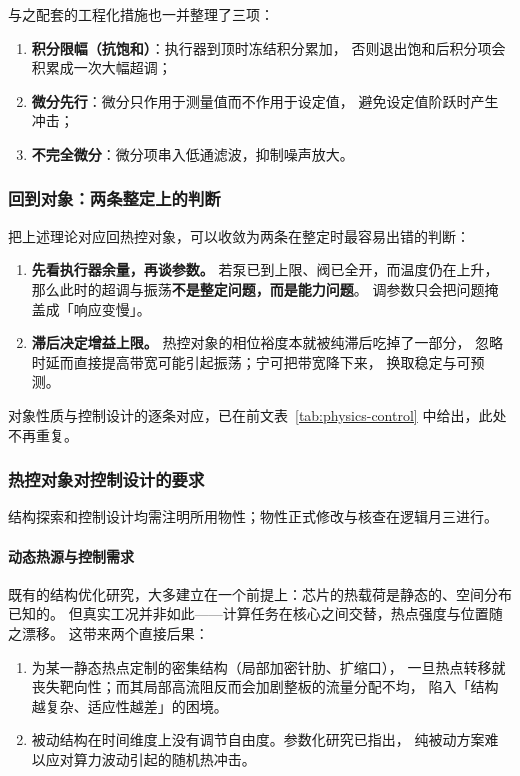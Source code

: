 \documentclass[stage2,fontset=fandol]{ydzjreport}
\begin{document}
	与之配套的工程化措施也一并整理了三项：
	\begin{enumerate}
		\item \textbf{积分限幅（抗饱和）}：执行器到顶时冻结积分累加，
		否则退出饱和后积分项会积累成一次大幅超调；
		\item \textbf{微分先行}：微分只作用于测量值而不作用于设定值，
		避免设定值阶跃时产生冲击；
		\item \textbf{不完全微分}：微分项串入低通滤波，抑制噪声放大。
	\end{enumerate}

	\subsubsection{回到对象：两条整定上的判断}

	把上述理论对应回热控对象，可以收敛为两条在整定时最容易出错的判断：

	\begin{enumerate}
		\item \textbf{先看执行器余量，再谈参数。}
		若泵已到上限、阀已全开，而温度仍在上升，
		那么此时的超调与振荡\textbf{不是整定问题，而是能力问题}。
		调参数只会把问题掩盖成「响应变慢」。
		\item \textbf{滞后决定增益上限。}
		热控对象的相位裕度本就被纯滞后吃掉了一部分，
		忽略时延而直接提高带宽可能引起振荡；宁可把带宽降下来，
		换取稳定与可预测。
	\end{enumerate}

	对象性质与控制设计的逐条对应，已在前文表~\ref{tab:physics-control} 中给出，此处不再重复。

\subsubsection{热控对象对控制设计的要求}

	结构探索和控制设计均需注明所用物性；物性正式修改与核查在逻辑月三进行。


	\paragraph{动态热源与控制需求}

	既有的结构优化研究，大多建立在一个前提上：芯片的热载荷是静态的、空间分布已知的。
	但真实工况并非如此——计算任务在核心之间交替，热点强度与位置随之漂移\cite{wu,ji}。
	这带来两个直接后果：

	\begin{enumerate}
		\item 为某一静态热点定制的密集结构（局部加密针肋、扩缩口），
		一旦热点转移就丧失靶向性；而其局部高流阻反而会加剧整板的流量分配不均，
		陷入「结构越复杂、适应性越差」的困境。
		\item 被动结构在时间维度上没有调节自由度。参数化研究已指出，
		纯被动方案难以应对算力波动引起的随机热冲击\cite{laguna}。
	\end{enumerate}
\end{document}
